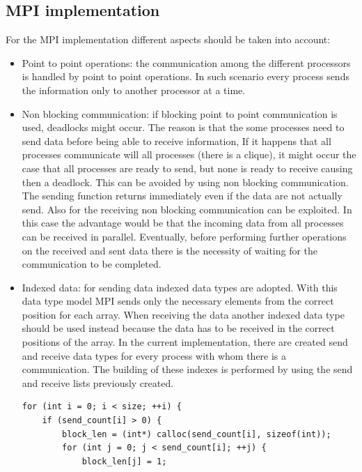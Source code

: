 \documentclass[12pt, a4paper]{article}
\begin{document}
  \subsection*{MPI implementation}
  For the MPI implementation different aspects should be taken into account:
  \begin{itemize}
    \item Point to point operations: the communication among the different
          processors is handled by point to point operations. In such scenario
          every process sends the information only to another processor at a
          time.
    \item Non blocking communication: if blocking point to point communication 
          is used, deadlocks might occur. The reason is that the some processes
          need to send data before being able to receive information, If it
          happens that all processes communicate will all processes (there is a
          clique), it might occur the case that all processes are ready to
          send, but none is ready to receive causing then a deadlock. This can
          be avoided by using non blocking communication. The sending function
          returns immediately even if the data are not actually send. Also for
          the receiving non blocking communication can be exploited. In this
          case the advantage would be that the incoming data from all processes
          can be received in parallel. Eventually, before performing further
          operations on the received and sent data there is the necessity of
          waiting for the communication to be completed.
    \item Indexed data: for sending data indexed data types are adopted. With
          this data type model MPI sends only the necessary elements from the
          correct position for each array. When receiving the data another
          indexed data type should be used instead because the data has to be
          received in the correct positions of the array. In the current
          implementation, there are created send and receive data types for
          every process with whom there is a communication. The building of
          these indexes is performed by using the send and receive lists
          previously created. 
          \begin{verbatim}
for (int i = 0; i < size; ++i) {
    if (send_count[i] > 0) {
        block_len = (int*) calloc(send_count[i], sizeof(int));
        for (int j = 0; j < send_count[i]; ++j) {
            block_len[j] = 1;

\end{verbatim}
\end{itemize}
\end{document}

